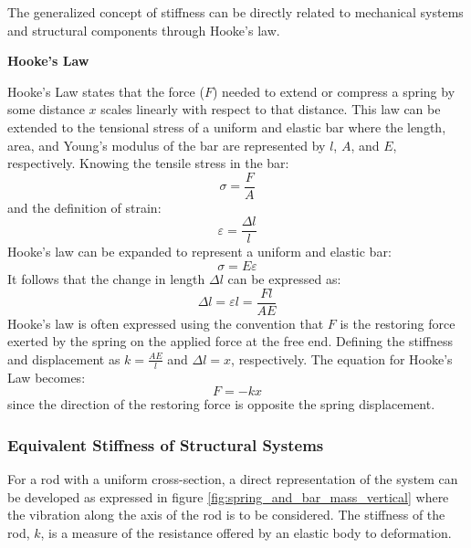 \documentclass[12pt,letter]{article}
\begin{document}
		The generalized concept of stiffness can be directly related to mechanical systems and structural components through Hooke's law. 
		\begin{review}
						\textbf{Hooke's Law}

		\noindent Hooke's Law states that the force ($F$) needed to extend or compress a spring by some distance $x$ scales linearly with respect to that distance. This law can be extended to the tensional stress of a uniform and elastic bar where the length, area, and Young's modulus of the bar are represented by $l$, $A$, and $E$, respectively. Knowing the tensile stress in the bar:
			\begin{equation}
			\sigma = \frac{F}{A}
			\end{equation} 			
			and the definition of strain:
			\begin{equation}
			\varepsilon = \frac{\Delta l}{l}
			\end{equation} 			
			Hooke's law can be expanded to represent a uniform and elastic bar:
			\begin{equation}
			\sigma = E \varepsilon
			\end{equation} 			
			It follows that the change in length $\Delta l$ can be expressed as:		
			\begin{equation}
			\Delta l = \varepsilon l = \frac{F l}{A E}
			\end{equation} 
			Hooke's law is often expressed using the convention that $F$ is the restoring force exerted by the spring on the applied force at the free end. Defining the stiffness and displacement as $k = \frac{AE}{l}$ and $\Delta l = x$, respectively. The equation for Hooke's Law becomes:
			\begin{equation}
			F = -kx
			\end{equation} 			
			since the direction of the restoring force is opposite the spring displacement.
		\end{review}
	
		\subsubsection{Equivalent Stiffness of Structural Systems}	
		
            For a rod with a uniform cross-section, a direct representation of the system can be developed as expressed in figure \ref{fig:spring_and_bar_mass_vertical} where the vibration along the axis of the rod is to be considered. The stiffness of the rod, $k$, is a measure of the resistance offered by an elastic body to deformation. 
\end{document}
